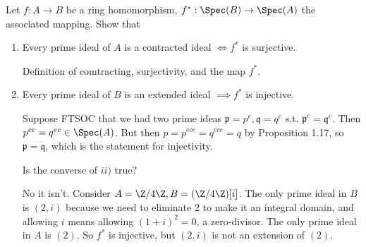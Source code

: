 \documentclass[a4paper]{exam}
\begin{document}
\begin{questions}
\question Let $f: A\to B $ be a ring homomorphism, $f^{\ast}: \Spec(B) \to \Spec(A) $ the associated mapping. Show that
\begin{enumerate}
\item Every prime ideal of $A $ is a contracted ideal $\iff f^\ast $ is surjective.
\begin{solution}
	Definition of comtracting, surjectivity, and the map $f^\ast $.
\end{solution}
\item Every prime ideal of $B $ is an extended ideal $\implies f^\ast $ is injective.
\begin{solution}
	Suppose FTSOC that we had two prime ideas $\mathfrak{p} = p^e,\mathfrak{q} = q^e$ s.t. $\mathfrak{p}^c = \mathfrak{q}^c $.
	Then $p^{ec} = q^{ec} \in \Spec(A)$.
	But then $p = p^{ece} = q^{ece} = q $ by Proposition 1.17, so $\mathfrak{p} = \mathfrak{q} $, which is the statement for injectivity.
\end{solution}
Is the converse of $ii) $ true?
\begin{solution}
	No it isn't. Consider $A = \Z / 4\Z, B = (\Z / 4 \Z)[i] $.
	The only prime ideal in $B $ is $(2,i) $ because we need to eliminate 2 to make it an integral domain, and allowing $i $ means allowing $(1+i)^2 = 0 $, a zero-divisor.
	The only prime ideal in $A $ is $(2)$.
	So $f^\ast $ is injective, but $(2,i) $ is not an extension of $(2) $.
\end{solution}
\end{enumerate}


\end{questions}
\end{document}
